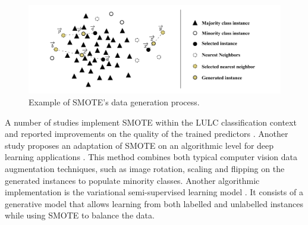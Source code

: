 \documentclass[parskip=full]{scrartcl}
\begin{document}
\begin{figure}[H]
	\centering
	\includegraphics[width=1\linewidth]{../analysis/smote_example}
	\caption{Example of SMOTE's data generation process.}
	\label{fig:smote_example}
\end{figure}

A number of studies implement SMOTE within the LULC classification context and
reported improvements on the quality of the trained predictors
\cite{Jozdani2019, Bogner2018}. Another study proposes an adaptation of SMOTE on
an algorithmic level for deep learning applications \cite{Zhu2020}. This method
combines both typical computer vision data augmentation techniques, such as
image rotation, scaling and flipping on the generated instances to populate
minority classes. Another algorithmic implementation is the variational
semi-supervised learning model \cite{Cenggoro2018}. It consists of a generative
model that allows learning from both labelled and unlabelled instances while
using SMOTE to balance the data.
\end{document}
